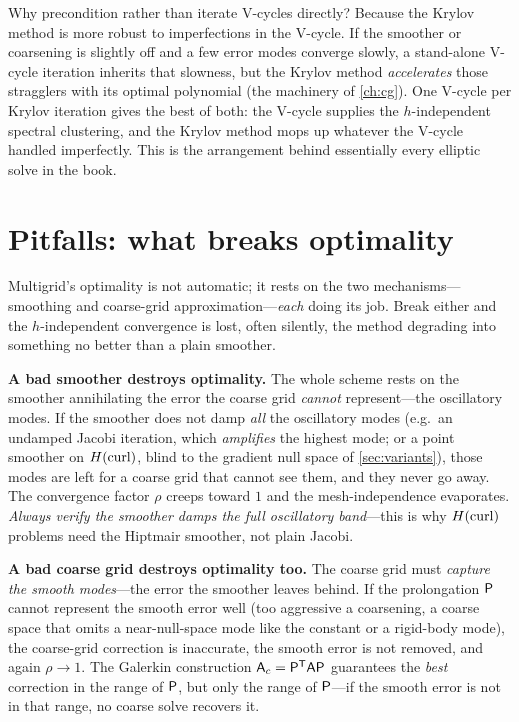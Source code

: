 Why precondition rather than iterate V-cycles directly? Because the Krylov method is more
robust to imperfections in the V-cycle. If the smoother or coarsening is slightly off and a
few error modes converge slowly, a stand-alone V-cycle iteration inherits that slowness, but
the Krylov method \emph{accelerates} those stragglers with its optimal polynomial (the
machinery of \cref{ch:cg}). One V-cycle per Krylov iteration gives the best of both: the
V-cycle supplies the $h$-independent spectral clustering, and the Krylov method mops up
whatever the V-cycle handled imperfectly. This is the arrangement behind essentially every
elliptic solve in the book.

\section{Pitfalls: what breaks optimality}

Multigrid's optimality is not automatic; it rests on the two mechanisms---smoothing and
coarse-grid approximation---\emph{each} doing its job. Break either and the $h$-independent
convergence is lost, often silently, the method degrading into something no better than a
plain smoother.

\begin{pitfall}
\textbf{A bad smoother destroys optimality.} The whole scheme rests on the smoother
annihilating the error the coarse grid \emph{cannot} represent---the oscillatory modes. If the
smoother does not damp \emph{all} the oscillatory modes (e.g.\ an undamped Jacobi iteration,
which \emph{amplifies} the highest mode; or a point smoother on $H(\mathrm{curl})$, blind to the gradient
null space of \cref{sec:variants}), those modes are left for a coarse grid that cannot see them,
and they never go away. The convergence factor $\rho$ creeps toward $1$ and the mesh-independence
evaporates. \emph{Always verify the smoother damps the full oscillatory band}---this is why
$H(\mathrm{curl})$ problems need the Hiptmair smoother, not plain Jacobi.
\end{pitfall}

\begin{pitfall}
\textbf{A bad coarse grid destroys optimality too.} The coarse grid must \emph{capture the
smooth modes}---the error the smoother leaves behind. If the prolongation $\mathsf{P}$ cannot
represent the smooth error well (too aggressive a coarsening, a coarse space that omits a
near-null-space mode like the constant or a rigid-body mode), the coarse-grid correction is
inaccurate, the smooth error is not removed, and again $\rho\to 1$. The Galerkin construction
$\mathsf{A}_c=\mathsf{P}^{\mathsf T}\mathsf{A}\mathsf{P}$ guarantees the \emph{best} correction in the
range of $\mathsf{P}$, but only the range of $\mathsf{P}$---if the smooth error is not in that range,
no coarse solve recovers it.
\end{pitfall}

